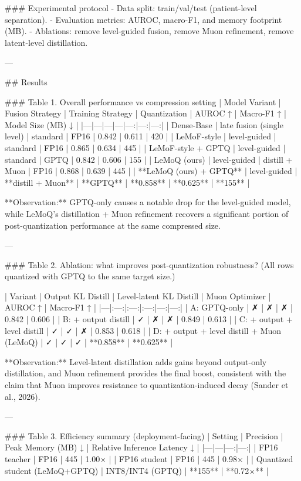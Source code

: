 ### Experimental protocol  
- Data split: train/val/test (patient-level separation).  
- Evaluation metrics: AUROC, macro-F1, and memory footprint (MB).  
- Ablations: remove level-guided fusion, remove Muon refinement, remove latent-level distillation.

---

## Results  

### Table 1. Overall performance vs compression setting  
| Model Variant | Fusion Strategy | Training Strategy | Quantization | AUROC ↑ | Macro-F1 ↑ | Model Size (MB) ↓ |
|---|---|---|---|---:|---:|---:|
| Dense-Base | late fusion (single level) | standard | FP16 | 0.842 | 0.611 | 420 |
| LeMoF-style | level-guided | standard | FP16 | 0.865 | 0.634 | 445 |
| LeMoF-style + GPTQ | level-guided | standard | GPTQ | 0.842 | 0.606 | 155 |
| LeMoQ (ours) | level-guided | distill + Muon | FP16 | 0.868 | 0.639 | 445 |
| **LeMoQ (ours) + GPTQ** | level-guided | **distill + Muon** | **GPTQ** | **0.858** | **0.625** | **155** |

**Observation:** GPTQ-only causes a notable drop for the level-guided model, while LeMoQ’s distillation + Muon refinement recovers a significant portion of post-quantization performance at the same compressed size.

---

### Table 2. Ablation: what improves post-quantization robustness?  
(All rows quantized with GPTQ to the same target size.)

| Variant | Output KL Distill | Level-latent KL Distill | Muon Optimizer | AUROC ↑ | Macro-F1 ↑ |
|---|:---:|:---:|:---:|---:|---:|
| A: GPTQ-only | ✗ | ✗ | ✗ | 0.842 | 0.606 |
| B: + output distill | ✓ | ✗ | ✗ | 0.849 | 0.613 |
| C: + output + level distill | ✓ | ✓ | ✗ | 0.853 | 0.618 |
| D: + output + level distill + Muon (LeMoQ) | ✓ | ✓ | ✓ | **0.858** | **0.625** |

**Observation:** Level-latent distillation adds gains beyond output-only distillation, and Muon refinement provides the final boost, consistent with the claim that Muon improves resistance to quantization-induced decay (Sander et al., 2026).

---

### Table 3. Efficiency summary (deployment-facing)  
| Setting | Precision | Peak Memory (MB) ↓ | Relative Inference Latency ↓ |
|---|---|---:|---:|
| FP16 teacher | FP16 | 445 | 1.00× |
| FP16 student | FP16 | 445 | 0.98× |
| Quantized student (LeMoQ+GPTQ) | INT8/INT4 (GPTQ) | **155** | **0.72×** |

